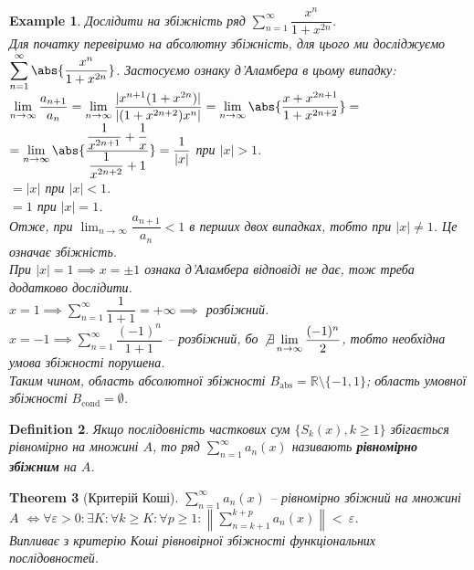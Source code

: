 \documentclass[a4paper, 10pt]{article}
\def\huge{\displaystyle}
\theoremstyle{theoremdd}
\newtheorem{theorem}{Theorem}[subsection]
\theoremstyle{theoremdd}
\theoremstyle{theoremdd}
\newtheorem{definition}[theorem]{Definition}
\theoremstyle{theoremdd}
\theoremstyle{theoremdd}
\newtheorem{example}[theorem]{Example}
\theoremstyle{theoremdd}
\theoremstyle{theoremdd}
\theoremstyle{theoremdd}
\theoremstyle{theoremdd}
\begin{document}
\begin{example}
Дослідити на збіжність ряд $\huge\sum_{n=1}^\infty \dfrac{x^n}{1+x^{2n}}$.\\
Для початку перевіримо на абсолютну збіжність, для цього ми досліджуємо $\huge\sum_{n=1}^\infty \abs{\dfrac{x^n}{1+x^{2n}}}$. Застосуємо ознаку д'Аламбера в цьому випадку:\\
$\huge\lim_{n \to \infty} \dfrac{a_{n+1}}{a_n} = \lim_{n \to \infty} \dfrac{|x^{n+1}(1+x^{2n})|}{|(1+x^{2n+2})x^n|} = \lim_{n \to \infty} \abs{ \dfrac{x+x^{2n+1}}{1+x^{2n+2}} } = $\\
$= \huge\lim_{n \to \infty} \abs{ \dfrac{\dfrac{1}{x^{2n+1}} + \dfrac{1}{x}}{\dfrac{1}{x^{2n+2}} + 1}} = \dfrac{1}{|x|}$ при $|x|>1$.\\
$= |x|$ при $|x| < 1$.\\
$= 1$ при $|x| = 1$.\\
Отже, при $\huge\lim_{n \to \infty} \dfrac{a_{n+1}}{a_n} < 1$ в перших двох випадках, тобто при $|x| \neq 1$. Це означає збіжність.\\
При $|x| = 1 \implies x = \pm 1$ ознака д'Аламбера відповіді не дає, тож треба додатково дослідити.\\
$x = 1 \implies \huge\sum_{n=1}^\infty \dfrac{1}{1+1} = +\infty \implies$ розбіжний.\\
$x = -1 \implies \huge\sum_{n=1}^\infty \dfrac{(-1)^n}{1+1}$ -- розбіжний, бо $\not\exists \huge\lim_{n \to \infty} \dfrac{(-1)^n}{2}$, тобто необхідна умова збіжності порушена.\\
Таким чином, область абсолютної збіжності $B_{\text{abs}} = \mathbb{R} \setminus \{-1,1\}$; область умовної збіжності $B_{\text{cond}} = \emptyset$.
\end{example}

\begin{definition}
Якщо послідовність часткових сум $\{S_k(x), k \geq 1\}$ збігається рівномірно на множині $A$, то ряд $\huge \sum_{n=1}^\infty a_n(x)$ називають \textbf{рівномірно збіжним} на $A$.
\end{definition}

\begin{theorem}[Критерій Коші]
$\huge \sum_{n=1}^\infty a_n(x)$ -- рівномірно збіжний на множині $A$ $\iff \forall \varepsilon > 0: \exists K: \forall k \geq K: \forall p \geq 1: \displaystyle\left\| \sum_{n=k+1}^{k+p} a_n(x)  \right\| < ~{\varepsilon}$.\\
\textit{Випливає з критерію Коші рівновірної збіжності функціональних послідовностей.}
\end{theorem}
\end{document}
